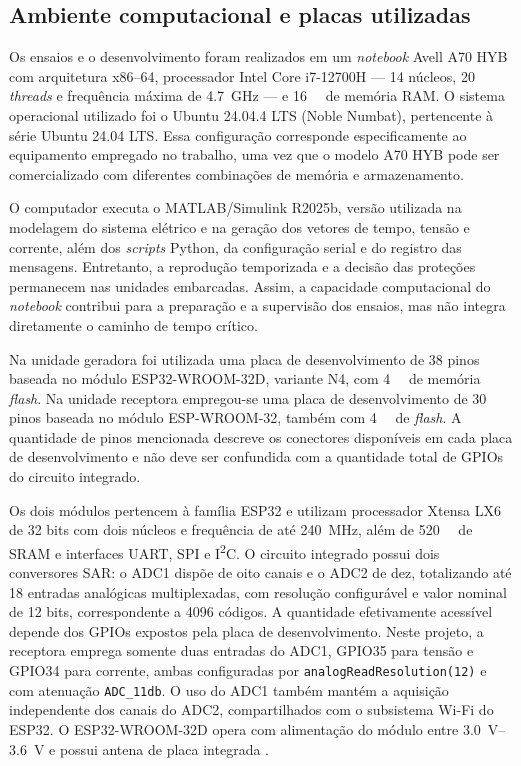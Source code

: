 \subsection{Ambiente computacional e placas utilizadas}

Os ensaios e o desenvolvimento foram realizados em um \textit{notebook} Avell A70 HYB com arquitetura x86--64, processador Intel Core i7-12700H --- 14 núcleos, 20 \textit{threads} e frequência máxima de \SI{4,7}{\giga\hertz} \cite{intel_i7_12700h} --- e \SI{16}{\gibi\byte} de memória RAM. O sistema operacional utilizado foi o Ubuntu 24.04.4 LTS (Noble Numbat), pertencente à série Ubuntu 24.04 LTS. Essa configuração corresponde especificamente ao equipamento empregado no trabalho, uma vez que o modelo A70 HYB pode ser comercializado com diferentes combinações de memória e armazenamento.

O computador executa o MATLAB/Simulink R2025b, versão utilizada na modelagem do sistema elétrico e na geração dos vetores de tempo, tensão e corrente, além dos \textit{scripts} Python, da configuração serial e do registro das mensagens. Entretanto, a reprodução temporizada e a decisão das proteções permanecem nas unidades embarcadas. Assim, a capacidade computacional do \textit{notebook} contribui para a preparação e a supervisão dos ensaios, mas não integra diretamente o caminho de tempo crítico.

Na unidade geradora foi utilizada uma placa de desenvolvimento de 38 pinos baseada no módulo ESP32-WROOM-32D, variante N4, com \SI{4}{\mebi\byte} de memória \textit{flash}. Na unidade receptora empregou-se uma placa de desenvolvimento de 30 pinos baseada no módulo ESP-WROOM-32, também com \SI{4}{\mebi\byte} de \textit{flash}. A quantidade de pinos mencionada descreve os conectores disponíveis em cada placa de desenvolvimento e não deve ser confundida com a quantidade total de GPIOs do circuito integrado.

Os dois módulos pertencem à família ESP32 e utilizam processador Xtensa LX6 de 32 bits com dois núcleos e frequência de até \SI{240}{\mega\hertz}, além de \SI{520}{\kibi\byte} de SRAM e interfaces UART, SPI e I\textsuperscript{2}C. O circuito integrado possui dois conversores SAR: o ADC1 dispõe de oito canais e o ADC2 de dez, totalizando até 18 entradas analógicas multiplexadas, com resolução configurável e valor nominal de 12 bits, correspondente a 4096 códigos. A quantidade efetivamente acessível depende dos GPIOs expostos pela placa de desenvolvimento. Neste projeto, a receptora emprega somente duas entradas do ADC1, GPIO35 para tensão e GPIO34 para corrente, ambas configuradas por \texttt{analogReadResolution(12)} e com atenuação \texttt{ADC\_11db}. O uso do ADC1 também mantém a aquisição independente dos canais do ADC2, compartilhados com o subsistema Wi-Fi do ESP32. O ESP32-WROOM-32D opera com alimentação do módulo entre \SIrange{3,0}{3,6}{\volt} e possui antena de placa integrada \cite{espressif_wroom32d,espressif_wroom32}.

